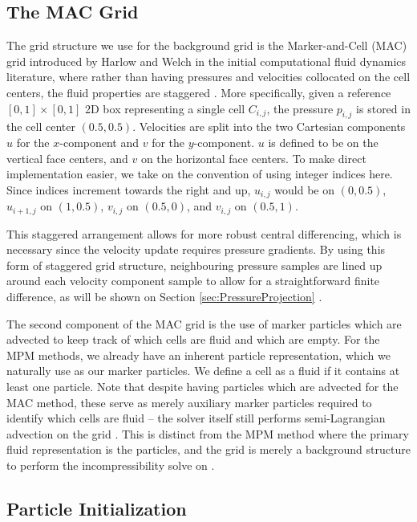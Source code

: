 \documentclass[sigconf]{acmart}
\begin{document}
\subsection{The MAC Grid}

The grid structure we use for the background grid is the Marker-and-Cell (MAC) grid introduced by Harlow and Welch in the initial computational fluid dynamics literature, where rather than having pressures and velocities collocated on the cell centers, the fluid properties are staggered \cite{harlow1965}. More specifically, given a reference $[0,1]\times[0,1]$ 2D box representing a single cell $C_{i,j}$, the pressure $p_{i,j}$ is stored in the cell center $(0.5,0.5)$. Velocities are split into the two Cartesian components $u$ for the $x$-component and $v$ for the $y$-component. $u$ is defined to be on the vertical face centers, and $v$ on the horizontal face centers. To make direct implementation easier, we take on the convention of using integer indices here. Since indices increment towards the right and up, $u_{i,j}$ would be on $(0,0.5)$, $u_{i+1,j}$ on $(1,0.5)$, $v_{i,j}$ on $(0.5,0)$, and $v_{i,j}$ on $(0.5,1)$.

This staggered arrangement allows for more robust central differencing, which is necessary since the velocity update requires pressure gradients. By using this form of staggered grid structure, neighbouring pressure samples are lined up around each velocity component sample to allow for a straightforward finite difference, as will be shown on Section \ref{sec:PressureProjection} \cite{bridson2015}.

The second component of the MAC grid is the use of marker particles which are advected to keep track of which cells are fluid and which are empty. For the MPM methods, we already have an inherent particle representation, which we naturally use as our marker particles. We define a cell as a fluid if it contains at least one particle. Note that despite having particles which are advected for the MAC method, these serve as merely auxiliary marker particles required to identify which cells are fluid -- the solver itself still performs semi-Lagrangian advection on the grid \cite{harlow1965}. This is distinct from the MPM method where the primary fluid representation is the particles, and the grid is merely a background structure to perform the incompressibility solve on \cite{zhu2005}.

\subsection{Particle Initialization}
\end{document}

